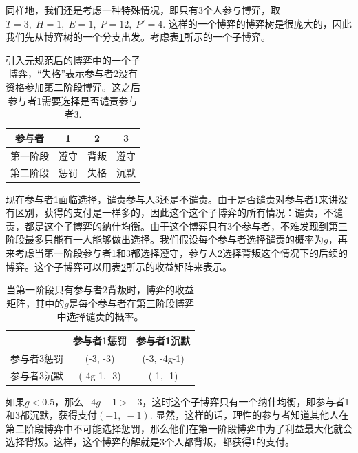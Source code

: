 \documentclass[lang=cn,11pt]{elegantpaper}
\begin{document}
同样地，我们还是考虑一种特殊情况，即只有3个人参与博弈，取$T=3,\;H=1,\;E=1,\;P=12,\;P'=4$. 这样的一个博弈的博弈树是很庞大的，因此我们先从博弈树的一个分支出发。考虑表\ref{tbl:subgame}所示的一个子博弈。
\begin{table}[htb]
	\centering
	\begin{tabular}{c|ccc}
		参与者 & 1 & 2 & 3 \\
		\hline
		第一阶段 & 遵守 & 背叛 & 遵守 \\
		第二阶段 & 惩罚 & 失格 & 沉默 
	\end{tabular}
	\caption{引入元规范后的博弈中的一个子博弈，“失格”表示参与者2没有资格参加第二阶段博弈。这之后参与者1需要选择是否谴责参与者3.\label{tbl:subgame}}
\end{table}
现在参与者1面临选择，谴责参与人3还是不谴责。由于是否谴责对参与者1来讲没有区别，获得的支付是一样多的，因此这个这个子博弈的所有情况：谴责，不谴责，都是这个子博弈的纳什均衡。由于这个博弈只有3个参与者，不难发现到第三阶段最多只能有一人能够做出选择。我们假设每个参与者选择谴责的概率为$g$，再来考虑当第一阶段参与者1和3都选择遵守，参与人2选择背叛这个情况下的后续的博弈。这个子博弈可以用表\ref{tbl:payoff}所示的收益矩阵来表示。

\begin{table}[htb] 
	\centering 
	\begin{tabular}{c|cc} 
		& 参与者1惩罚 & 参与者1沉默 \\
		\hline
		参与者3惩罚 & (-3, -3) & (-3, -4g-1)  \\
		参与者3沉默 & (-4g-1, -3) & (-1, -1)
	\end{tabular} 
	\caption{当第一阶段只有参与者2背叛时，博弈的收益矩阵，其中的$g$是每个参与者在第三阶段博弈中选择谴责的概率。\label{tbl:payoff}} 
\end{table}

如果$g<0.5$，那么$-4g-1>-3$，这时这个子博弈只有一个纳什均衡，即参与者1和3都沉默，获得支付$(-1,\;-1)$. 显然，这样的话，理性的参与者知道其他人在第二阶段博弈中不可能选择惩罚，那么他们在第一阶段博弈中为了利益最大化就会选择背叛。这样，这个博弈的解就是3个人都背叛，都获得1的支付。
\end{document}
